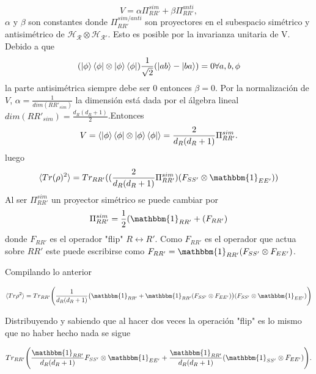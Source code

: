 \begin{equation}
V= \alpha \Pi_{RR'}^{sim} + \beta \Pi_{RR'}^{anti},
\end{equation}
$\alpha$ y $\beta$ son constantes donde $\Pi_{RR'}^{sim/anti}$ son proyectores en el subespacio simétrico y antisimétrico de $\mathcal{H_{R} \otimes H_{R'}}$. Esto es posible por la invarianza unitaria de V. Debido a que 
\begin{equation}
(\ket{\phi} \bra{\phi} \otimes \ket{\phi} \bra{\phi})\frac{1}{\sqrt{2}} ( \ket{ab} -\ket{ba})=0  \forall a,b,\phi
\end{equation}
la parte antisimétrica siempre debe ser 0 entonces $\beta=0$. Por la normalización de $V$, $\alpha= \frac{1}{dim(RR'_{sim})}$ la dimensión está dada por el álgebra lineal $dim(RR'_{sim})= \frac{d_{R}(d_{R}+1)}{2}$.Entonces
\begin{equation}
V= \langle \ket{\phi} \bra{\phi} \otimes \ket{\phi} \bra{\phi} \rangle = \frac{2}{d_{R}(d_{R} +1)} \Pi_{RR'}^{sim}.
\end{equation}
luego 
\begin{equation}
\langle Tr (\rho)^{2} \rangle = Tr_{RR'}((\frac{2}{d_{R}(d_{R} +1)} \Pi_{RR'}^{sim})(F_{SS'} \otimes \mathbbm{1}_{EE'}))
\end{equation}
Al ser $\Pi_{RR'}^{sim}$ un proyector simétrico se puede cambiar por 
\begin{equation}
\Pi_{RR'}^{sim}=\frac{1}{2}(\mathbbm{1}_{RR'}+(F_{RR'} )
\end{equation}
donde $F_{RR'}$ es el operador "flip" $R \longleftrightarrow R'$. Como $F_{RR'}$ es el operador que actua sobre $RR'$ este puede escribirse como $F_{RR'}= \mathbbm{1}_{RR'}(F_{SS'} \otimes F_{EE'})$.

Compilando lo anterior

\begin{equation}
\langle Tr \rho^2 \rangle = Tr_{RR'} \Bigg( \frac{1}{d_{R}(d_{R}+1)} \big( \mathbbm{1}_{RR'}+\mathbbm{1}_{RR'}(F_{SS'} \otimes F_{EE'}) \big)  (F_{SS'}\otimes \mathbbm{1}_{EE'})   \Bigg)
\end{equation}

Distribuyendo y sabiendo que al hacer dos veces la operación "flip"  es lo mismo que no haber hecho nada se sigue

\begin{equation}
Tr_{RR'} \Bigg( \frac{\mathbbm{1}_{RR'}}{d_{R}(d_{R}+1)} F_{SS'} \otimes \mathbbm{1}_{EE'} + \frac{\mathbbm{1}_{RR'}}{d_{R}(d_{R}+1)} (\mathbbm{1}_{SS'} \otimes F_{EE'})  \Bigg).
\end{equation}


